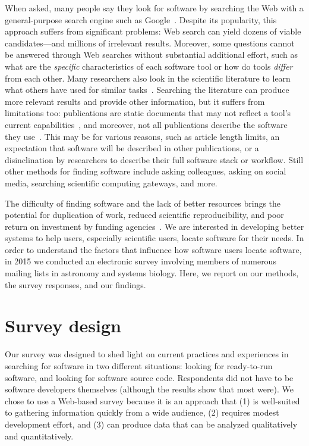\documentclass{casicswhitepaper}
\begin{document}
When asked, many people say they look for software by searching the Web with a general-purpose search engine such as Google~\cite{samadi_2004, umarji_2008}.  Despite its popularity, this approach suffers from significant problems: Web search can yield dozens of viable candidates---and millions of irrelevant results.  Moreover, some questions cannot be answered through Web searches without substantial additional effort, such as what are the \emph{specific} characteristics of each software tool or how do tools \emph{differ} from each other.  Many researchers also look in the scientific literature to learn what others have used for similar tasks~\cite{lawrence2015science, joppa2013troubling}.  Searching the literature can produce more relevant results and provide other information, but it suffers from limitations too: publications are static documents that may not reflect a tool's current capabilities~\cite{wren_2004}, and moreover, not all publications describe the software they use~\cite{howison2015software}.  This may be for various reasons, such as article length limits, an expectation that software will be described in other publications, or a disinclination by researchers to describe their full software stack or workflow.  Still other methods for finding software include asking colleagues, asking on social media, searching scientific computing gateways, and more.

The difficulty of finding software and the lack of better resources brings the potential for duplication of work, reduced scientific reproducibility, and poor return on investment by funding agencies~\citep{cannata_2005, national2003sharing, crook2013learning, poisot2015best, white2014nih, niemeyer2016challenge}.  We are interested in developing better systems to help users, especially scientific users, locate software for their needs.  In order to understand the factors that influence how software users locate software, in 2015 we conducted an electronic survey involving members of numerous mailing lists in astronomy and systems biology.  Here, we report on our methods, the survey responses, and our findings.


\section{Survey design}

Our survey was designed to shed light on current practices and experiences in searching for software in two different situations: looking for ready-to-run software, and looking for software source code.  Respondents did not have to be software developers themselves (although the results show that most were).  We chose to use a Web-based survey because it is an approach that (1) is well-suited to gathering information quickly from a wide audience, (2) requires modest development effort, and (3) can produce data that can be analyzed qualitatively and quantitatively.
\end{document}
